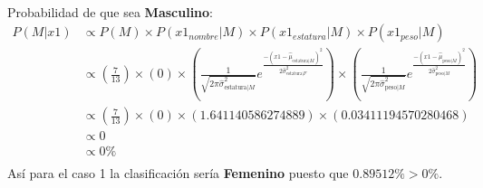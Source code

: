 \documentclass[12pt]{article}
\begin{document}
\paragraph{}Probabilidad de que sea \textbf{Masculino}:\\
\begin{equation}
\begin{split}
P(M|x1) &\propto P(M) \times P(x1_{nombre}|M) \times P(x1_{estatura}|M) \times P(x1_{peso}|M) \\
&\propto (\frac{7}{13}) \times (0) \times (\frac{1}{\sqrt{2\pi\hat{\sigma}_{\text{estatura}|M}^2}}e^{\frac{-(x1 - \hat{\mu}_{\text{estatura}|M})^2}{2\hat{\sigma}_{\text{estatura}|F}^2}}) \times (\frac{1}{\sqrt{2\pi\hat{\sigma}_{\text{peso}|M}^2}}e^{\frac{-(x1 - \hat{\mu}_{\text{peso}|M})^2}{2\hat{\sigma}_{\text{peso}|M}^2}}) \\
&\propto (\frac{7}{13}) \times (0) \times (1.641140586274889) \times (0.03411194570280468) \\
&\propto 0 \\
&\propto 0 \% \\
\end{split}
\end{equation}
Así para el caso 1 la clasificación sería \textbf{Femenino} puesto que $0.89512\% > 0\%$.\\
\clearpage
\pagebreak
\end{document}
